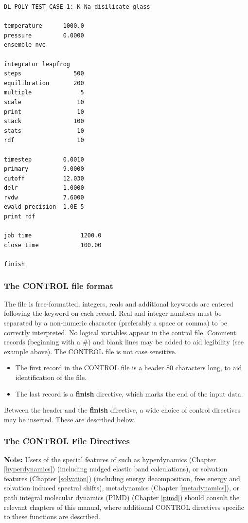 \begin{verbatim}
DL_POLY TEST CASE 1: K Na disilicate glass

temperature      1000.0
pressure         0.0000
ensemble nve 

integrator leapfrog
steps               500
equilibration       200
multiple              5
scale                10
print                10
stack               100
stats                10
rdf                  10

timestep         0.0010
primary          9.0000
cutoff           12.030
delr             1.0000
rvdw             7.6000
ewald precision  1.0E-5
print rdf 

job time              1200.0
close time            100.00

finish 
\end{verbatim}

\subsubsection{The CONTROL file format}

The file is free-formatted, integers, reals and additional keywords
are entered following the keyword on each record. Real and integer
numbers must be separated by a non-numeric character (preferably a
space or comma) to be correctly interpreted. No logical variables
appear in the control file. Comment records (beginning with a \#) and
blank lines may be added to aid legibility (see example above).  The
CONTROL file is not case sensitive.

\begin{itemize}
\item The first record in the CONTROL file is a header 80 characters
long,
to aid identification of the file.
\item The last record is a {\bf finish} directive, which marks the end
of the input data.
\end{itemize}

Between the header and the {\bf finish} directive, a wide choice of
control
directives may be inserted. These are described below.

\subsubsection{The CONTROL File Directives}

{\bf Note:} Users of the special features of \D{} such as hyperdynamics
(Chapter \ref{hyperdynamics}) (including nudged elastic band
calculations), or solvation features (Chapter \ref{solvation})
(including energy decomposition, free energy and solvation induced
spectral shifts), metadynamics (Chapter \ref{metadynamics}), or path
integral molecular dynamics (PIMD) (Chapter \ref{pimd}) should consult
the relevant chapters of this manual, where additional CONTROL
directives specific to these functions are described.

